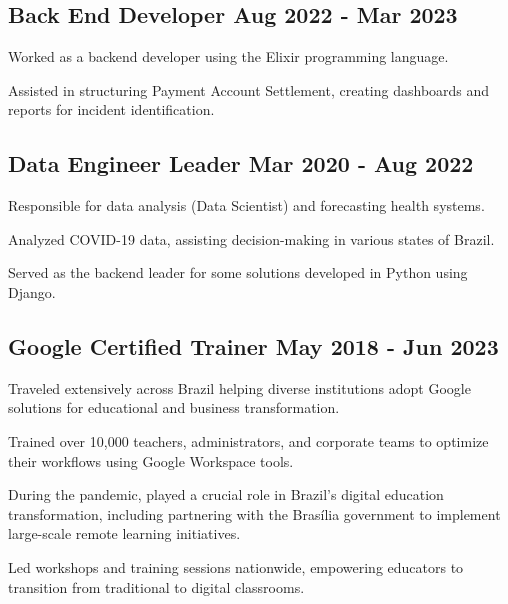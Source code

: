 \documentclass[letter,10pt]{article}
\begin{document}
\subsection{{Back End Developer \hfill Aug 2022 - Mar 2023}}
\begin{zitemize}
\item Worked as a backend developer using the Elixir programming language.
\item Assisted in structuring Payment Account Settlement, creating dashboards and reports for incident identification.
\end{zitemize}

\subsection{{Data Engineer Leader \hfill Mar 2020 - Aug 2022}}
\begin{zitemize}
\item Responsible for data analysis (Data Scientist) and forecasting health systems.
\item Analyzed COVID-19 data, assisting decision-making in various states of Brazil.
\item Served as the backend leader for some solutions developed in Python using Django.
\end{zitemize}

\newpage

\subsection{{Google Certified Trainer \hfill May 2018 - Jun 2023}}
\begin{zitemize}
\item Traveled extensively across Brazil helping diverse institutions adopt Google solutions for educational and business transformation.
\item Trained over 10,000 teachers, administrators, and corporate teams to optimize their workflows using Google Workspace tools.
\item During the pandemic, played a crucial role in Brazil's digital education transformation, including partnering with the Brasília government to implement large-scale remote learning initiatives.
\item Led workshops and training sessions nationwide, empowering educators to transition from traditional to digital classrooms.
\end{zitemize}
\end{document}
